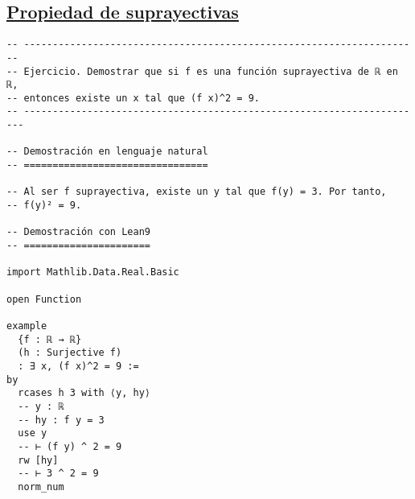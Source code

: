 \subsection{\href{./src/Logica/Propiedad\_de\_suprayectivas.lean}{Propiedad de suprayectivas}}
\label{sec:orgc758ef0}
\begin{verbatim}
-- ---------------------------------------------------------------------
-- Ejercicio. Demostrar que si f es una función suprayectiva de ℝ en ℝ,
-- entonces existe un x tal que (f x)^2 = 9.
-- ----------------------------------------------------------------------

-- Demostración en lenguaje natural
-- ================================

-- Al ser f suprayectiva, existe un y tal que f(y) = 3. Por tanto,
-- f(y)² = 9.

-- Demostración con Lean9
-- ======================

import Mathlib.Data.Real.Basic

open Function

example
  {f : ℝ → ℝ}
  (h : Surjective f)
  : ∃ x, (f x)^2 = 9 :=
by
  rcases h 3 with ⟨y, hy⟩
  -- y : ℝ
  -- hy : f y = 3
  use y
  -- ⊢ (f y) ^ 2 = 9
  rw [hy]
  -- ⊢ 3 ^ 2 = 9
  norm_num
\end{verbatim}

